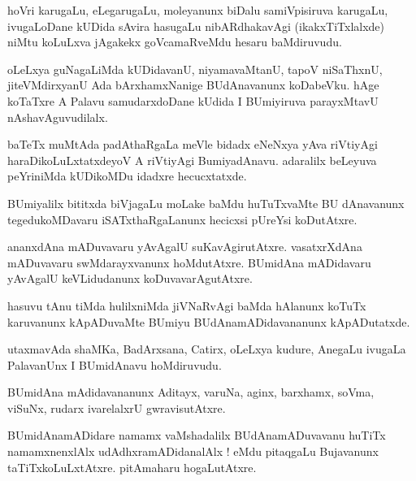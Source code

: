 \documentclass{article}
\begin{document}
\begin{mn}%
hoVri karugaLu, eLegarugaLu, moleyanunx biDalu samiVpisiruva karugaLu, ivugaLoDane kUDida sAvira 
hasugaLu nibARdhakavAgi (ikakxTiTxlalxde) niMtu koLuLxva jAgakekx goVcamaRveMdu hesaru baMdiruvudu.
\end{mn}

\begin{mn}%
oLeLxya guNagaLiMda kUDidavanU, niyamavaMtanU, tapoV niSaThxnU, jiteVMdirxyanU Ada bArxhamxNanige 
BUdAnavanunx koDabeVku. hAge koTaTxre A Palavu samudarxdoDane kUdida I BUmiyiruva parayxMtavU 
nAshavAguvudilalx.
\end{mn}

\begin{mn}%
baTeTx muMtAda padAthaRgaLa meVle bidadx eNeNxya yAva riVtiyAgi haraDikoLuLxtatxdeyoV A riVtiyAgi 
BumiyadAnavu. adaralilx beLeyuva peYriniMda kUDikoMDu idadxre hecucxtatxde.
\end{mn}

\begin{mn}%
BUmiyalilx bititxda biVjagaLu moLake baMdu huTuTxvaMte BU dAnavanunx tegedukoMDavaru 
iSATxthaRgaLanunx hecicxsi pUreYsi koDutAtxre. 
\end{mn}

\begin{mn}%
ananxdAna mADuvavaru yAvAgalU suKavAgirutAtxre. vasatxrXdAna mADuvavaru swMdarayxvanunx 
hoMdutAtxre. BUmidAna mADidavaru yAvAgalU keVLidudanunx koDuvavarAgutAtxre.
\end{mn}

\begin{mn}%
hasuvu tAnu tiMda hulilxniMda jiVNaRvAgi baMda hAlanunx koTuTx karuvanunx kApADuvaMte BUmiyu 
BUdAnamADidavananunx kApADutatxde.
\end{mn}

\begin{mn}%
utaxmavAda shaMKa, BadArxsana, Catirx, oLeLxya kudure, AnegaLu ivugaLa PalavanUnx I BUmidAnavu 
hoMdiruvudu.
\end{mn}

\begin{mn}%
BUmidAna mAdidavananunx Aditayx, varuNa, aginx, barxhamx, soVma, viSuNx, rudarx ivarelalxrU 
gwravisutAtxre.
\end{mn}

\begin{mn}%
BUmidAnamADidare namamx vaMshadalilx BUdAnamADuvavanu huTiTx namamxnenxlAlx udAdhxramADidanalAlx ! 
eMdu pitaqgaLu Bujavanunx taTiTxkoLuLxtAtxre. pitAmaharu hogaLutAtxre.
\end{mn}
\end{document}
